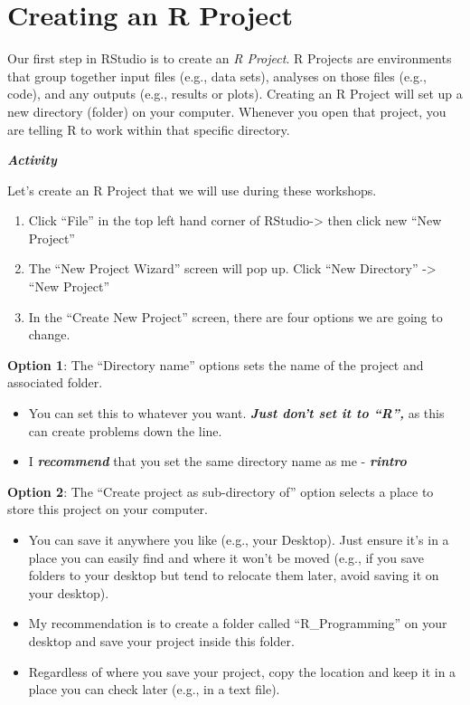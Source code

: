 \documentclass[
]{book}
\begin{document}
\hypertarget{creating-an-r-project}{%
\section{Creating an R Project}\label{creating-an-r-project}}

Our first step in RStudio is to create an \emph{R Project}. R Projects are environments that group together input files (e.g., data sets), analyses on those files (e.g., code), and any outputs (e.g., results or plots). Creating an R Project will set up a new directory (folder) on your computer. Whenever you open that project, you are telling R to work within that specific directory.

\textbf{\emph{Activity}}

Let's create an R Project that we will use during these workshops.

\begin{enumerate}
\def\labelenumi{\arabic{enumi}.}
\item
  Click ``File'' in the top left hand corner of RStudio-\textgreater{} then click new ``New Project''
\item
  The ``New Project Wizard'' screen will pop up. Click ``New Directory'' -\textgreater{} ``New Project''
\item
  In the ``Create New Project'' screen, there are four options we are going to change.
\end{enumerate}

\textbf{Option 1}: The ``Directory name'' options sets the name of the project and associated folder.

\begin{itemize}
\item
  You can set this to whatever you want. \textbf{\emph{Just don't set it to ``R'',}} as this can create problems down the line.
\item
  I \textbf{\emph{recommend}} that you set the same directory name as me - \textbf{\emph{rintro}}
\end{itemize}

\textbf{Option 2}: The ``Create project as sub-directory of'' option selects a place to store this project on your computer.

\begin{itemize}
\item
  You can save it anywhere you like (e.g., your Desktop). Just ensure it's in a place you can easily find and where it won't be moved (e.g., if you save folders to your desktop but tend to relocate them later, avoid saving it on your desktop).
\item
  My recommendation is to create a folder called ``R\_Programming'' on your desktop and save your project inside this folder.
\item
  Regardless of where you save your project, copy the location and keep it in a place you can check later (e.g., in a text file).
\end{itemize}
\end{document}
